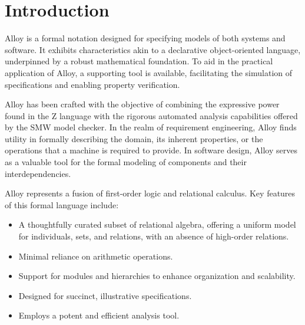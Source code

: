 \section{Introduction}

Alloy is a formal notation designed for specifying models of both systems and software. 
It exhibits characteristics akin to a declarative object-oriented language, underpinned by a robust mathematical foundation.   
To aid in the practical application of Alloy, a supporting tool is available, facilitating the simulation of specifications and enabling property verification.

Alloy has been crafted with the objective of combining the expressive power found in the Z language with the rigorous automated analysis capabilities offered by the SMW model checker.
In the realm of requirement engineering, Alloy finds utility in formally describing the domain, its inherent properties, or the operations that a machine is required to provide.
In software design, Alloy serves as a valuable tool for the formal modeling of components and their interdependencies.    

Alloy represents a fusion of first-order logic and relational calculus. 
Key features of this formal language include:
\begin{itemize}
    \item A thoughtfully curated subset of relational algebra, offering a uniform model for individuals, sets, and relations, with an absence of high-order relations.
    \item Minimal reliance on arithmetic operations.
    \item Support for modules and hierarchies to enhance organization and scalability.
    \item Designed for succinct, illustrative specifications.
    \item Employs a potent and efficient analysis tool.
\end{itemize}